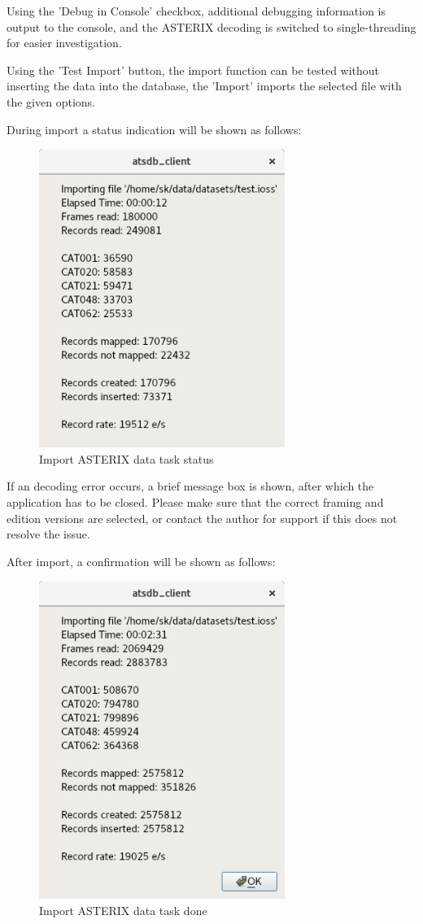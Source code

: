 {Using the 'Debug in Console' checkbox, additional debugging information is output to the console, and the ASTERIX decoding is switched to single-threading for easier investigation.

Using the 'Test Import' button, the import function can be tested without inserting the data into the database, the 'Import' imports the selected file with the given options.

During import a status indication will be shown as follows:

\begin{figure}[H]
  \center
    \includegraphics[width=8cm,frame]{../screenshots/asterix_import_status.png}
  \caption{Import ASTERIX data task status}
\end{figure}

If an decoding error occurs, a brief message box is shown, after which the application has to be closed. Please make sure that the correct framing and edition versions are selected, or contact the author for support if this does not resolve the issue.

After import, a confirmation will be shown as follows:

\begin{figure}[H]
  \center
    \includegraphics[width=8cm,frame]{../screenshots/asterix_import_done.png}
  \caption{Import ASTERIX data task done}
\end{figure}

}

